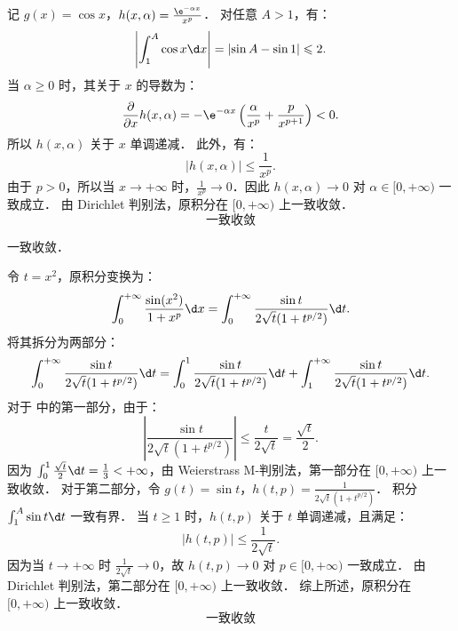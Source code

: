 \begin{solution}
    记 $g(x) = \cos x$，$h(x, \alpha) = \frac{\e^{-\alpha x}}{x^p}$．
    对任意 $A > 1$，有：
    \begin{equation}
        \left| \int_1^A \cos x \d x \right| = \left| \sin A - \sin 1 \right| \leqslant 2.
    \end{equation}
    当 $\alpha \geqslant 0$ 时，其关于 $x$ 的导数为：
    \begin{equation}
        \frac{\partial}{\partial x} h(x, \alpha) = -\e^{-\alpha x} \left( \frac{\alpha}{x^p} + \frac{p}{x^{p+1}} \right) < 0.
    \end{equation}
    所以 $h(x, \alpha)$ 关于 $x$ 单调递减．
    此外，有：
    \begin{equation}
        \left| h(x, \alpha) \right| \leqslant \frac{1}{x^p}.
    \end{equation}
    由于 $p > 0$，所以当 $x \to +\infty$ 时，$\frac{1}{x^p} \to 0$．因此 $h(x, \alpha) \to 0$ 对 $\alpha \in [0, +\infty)$ 一致成立．
    由 Dirichlet 判别法，原积分在 $[0, +\infty)$ 上一致收敛．
    \begin{equation}
        \boxed{\text{一致收敛}}
    \end{equation}

     一致收敛．

    令 $t = x^2$，原积分变换为：
    \begin{equation}
        \int_0^{+\infty} \frac{\sin(x^2)}{1 + x^p} \d x = \int_0^{+\infty} \frac{\sin t}{2\sqrt{t}(1 + t^{p/2})} \d t.
    \end{equation}
    将其拆分为两部分：
    \begin{equation}\label{eq:part6-split}
        \int_0^{+\infty} \frac{\sin t}{2\sqrt{t}(1 + t^{p/2})} \d t = \int_0^1 \frac{\sin t}{2\sqrt{t}(1 + t^{p/2})} \d t + \int_1^{+\infty} \frac{\sin t}{2\sqrt{t}(1 + t^{p/2})} \d t.
    \end{equation}
    对于  中的第一部分，由于：
    \begin{equation}
        \left| \frac{\sin t}{2\sqrt{t}(1 + t^{p/2})} \right| \leqslant \frac{t}{2\sqrt{t}} = \frac{\sqrt{t}}{2}.
    \end{equation}
    因为 $\int_0^1 \frac{\sqrt{t}}{2} \d t = \frac{1}{3} < +\infty$，由 Weierstrass M-判别法，第一部分在 $[0, +\infty)$ 上一致收敛．
    对于第二部分，令 $g(t) = \sin t$，$h(t, p) = \frac{1}{2\sqrt{t}(1 + t^{p/2})}$．
    积分 $\int_1^A \sin t \d t$ 一致有界．
    当 $t \geqslant 1$ 时，$h(t, p)$ 关于 $t$ 单调递减，且满足：
    \begin{equation}
        \left| h(t, p) \right| \leqslant \frac{1}{2\sqrt{t}}.
    \end{equation}
    因为当 $t \to +\infty$ 时 $\frac{1}{2\sqrt{t}} \to 0$，故 $h(t, p) \to 0$ 对 $p \in [0, +\infty)$ 一致成立．
    由 Dirichlet 判别法，第二部分在 $[0, +\infty)$ 上一致收敛．
    综上所述，原积分在 $[0, +\infty)$ 上一致收敛．
    \begin{equation}
        \boxed{\text{一致收敛}}
    \end{equation}
\end{solution}

